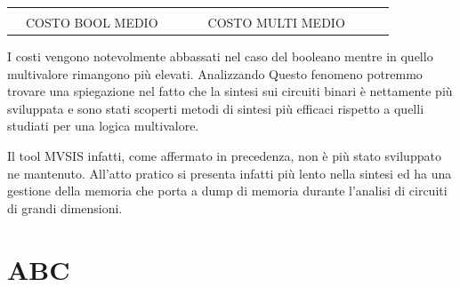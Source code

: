 \documentclass[italian,]{book}
\begin{document}
\begin{longtable}[]{@{}lllllllll@{}}
\begin{minipage}[t]{0.07\columnwidth}
\strut
\end{minipage}\tabularnewline
\begin{minipage}[t]{0.07\columnwidth}\raggedright
\strut
\end{minipage} & \begin{minipage}[t]{0.11\columnwidth}\raggedright
COSTO BOOL MEDIO\strut
\end{minipage} & \begin{minipage}[t]{0.08\columnwidth}\raggedright
\strut
\end{minipage} & \begin{minipage}[t]{0.07\columnwidth}\raggedright
\strut
\end{minipage} & \begin{minipage}[t]{0.09\columnwidth}\raggedright
\strut
\end{minipage} & \begin{minipage}[t]{0.12\columnwidth}\raggedright
COSTO MULTI MEDIO\strut
\end{minipage} & \begin{minipage}[t]{0.08\columnwidth}\raggedright
\strut
\end{minipage} & \begin{minipage}[t]{0.07\columnwidth}\raggedright
\strut
\end{minipage} & \begin{minipage}[t]{0.07\columnwidth}\raggedright
\strut
\end{minipage}\tabularnewline
\bottomrule
\end{longtable}

I costi vengono notevolmente abbassati nel caso del booleano mentre in quello multivalore rimangono più elevati. Analizzando Questo fenomeno potremmo trovare una spiegazione nel fatto che la sintesi sui circuiti binari è nettamente più sviluppata e sono stati scoperti metodi di sintesi più efficaci rispetto a quelli studiati per una logica multivalore.

Il tool MVSIS infatti, come affermato in precedenza, non è più stato sviluppato ne mantenuto. All'atto pratico si presenta infatti più lento nella sintesi ed ha una gestione della memoria che porta a dump di memoria durante l'analisi di circuiti di grandi dimensioni.

\newpage

\hypertarget{abc-2}{%
\section{ABC}\label{abc-2}}
\end{document}
